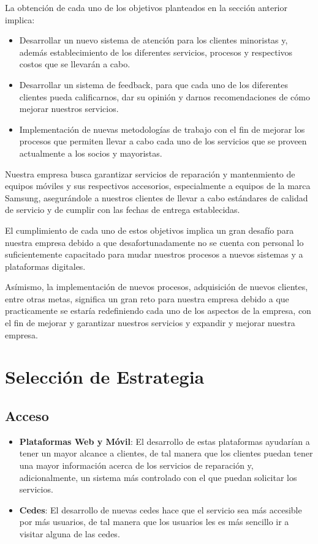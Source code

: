 	La obtención de cada uno de los objetivos planteados en la sección
	anterior implica:

	\begin{itemize}
		\item Desarrollar un nuevo sistema de atención para los clientes minoristas
			y, además establecimiento de los diferentes servicios, procesos
			y respectivos costos que se llevarán a cabo.

		\item Desarrollar un sistema de feedback, para que cada uno de
			los diferentes clientes pueda calificarnos, dar su opinión y darnos
			recomendaciones de cómo mejorar nuestros servicios.

		\item Implementación de nuevas metodologías de trabajo con el fin
			de mejorar los procesos que permiten llevar a cabo cada uno de los
			servicios que se proveen actualmente a los socios y mayoristas.
	\end{itemize}

	Nuestra empresa busca garantizar servicios de reparación y mantenmiento
	de equipos móviles y sus respectivos accesorios, especialmente a
	equipos de la marca Samsung, asegurándole a nuestros clientes de llevar
	a cabo estándares de calidad de servicio y de cumplir con las fechas
	de entrega establecidas.

	El cumplimiento de cada uno de estos objetivos implica un gran desafío
	para nuestra empresa debido a que desafortunadamente no se cuenta con
	personal lo suficientemente capacitado para mudar nuestros procesos
	a nuevos sistemas y a plataformas digitales.

	Asímismo, la implementación de nuevos procesos, adquisición de nuevos
	clientes, entre otras metas, significa un gran reto para nuestra empresa
	debido a que practicamente se estaría redefiniendo cada uno de los aspectos
	de la empresa, con el fin de mejorar y garantizar nuestros
	servicios y expandir y mejorar nuestra empresa.

	\section{Selección de Estrategia}

	\subsection{Acceso}

	\begin{itemize}
		\item \textbf{Plataformas Web y Móvil}: El desarrollo de estas plataformas
			ayudarían a tener un mayor alcance a clientes, de tal manera
			que los clientes puedan tener una mayor información acerca de
			los servicios de reparación y, adicionalmente, un sistema más
			controlado con el que puedan solicitar los servicios.

		\item \textbf{Cedes}: El desarrollo de nuevas cedes hace que el servicio
			sea más accesible por más usuarios, de tal manera que los
			usuarios les es más sencillo ir a visitar alguna de las cedes.
	\end{itemize}

